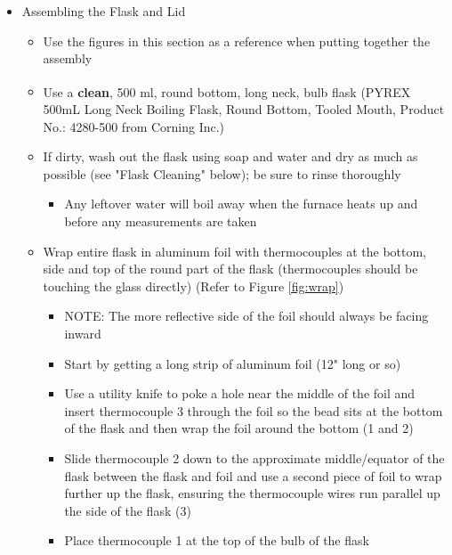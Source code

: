\documentclass[letterpaper,11pt]{article}
\begin{document}
\begin{itemize}
\newpage      
    \item Assembling the Flask and Lid 
        \begin{itemize}
        \item Use the figures in this section as a reference when putting 
            together the assembly
        
        \item Use a \textbf{clean}, 500 ml, round bottom, long neck, bulb flask 
            (PYREX\textsuperscript{\textcopyright} 500mL Long Neck Boiling 
            Flask, Round Bottom, Tooled Mouth, Product No.: 4280-500 from Corning Inc.)
        \item If dirty, wash out the flask using soap and water and dry as much 
            as possible (see "Flask Cleaning" below); be sure to rinse
            thoroughly
                \begin{itemize}
                \item Any leftover water will boil away when the furnace heats 
                up and before any measurements are taken
                \end{itemize}        
        \item Wrap entire flask in aluminum foil with thermocouples at the 
            bottom, side and top of the round part of the flask (thermocouples 
            should be touching the glass directly) (Refer to Figure 
            \ref{fig:wrap})
                \begin{itemize}
                \item NOTE: The more reflective side of the foil should always 
                    be facing inward
                \item Start by getting a long strip of aluminum foil (12" long 
                    or so)
                \item Use a utility knife to poke a hole near the middle of 
                    the foil and insert thermocouple 3 through the foil so the 
                    bead sits at the bottom of the flask and then wrap the foil 
                    around the bottom (1 and 2)
                \item Slide thermocouple 2 down to the approximate 
                    middle/equator of the flask between the flask and foil and 
                    use a second piece of foil to wrap further up the flask, 
                    ensuring the thermocouple wires run parallel up the side of 
                    the flask (3)
                \item Place thermocouple 1 at the top of the bulb of the flask 

\end{itemize}
\end{itemize}
\end{itemize}
\end{document}
